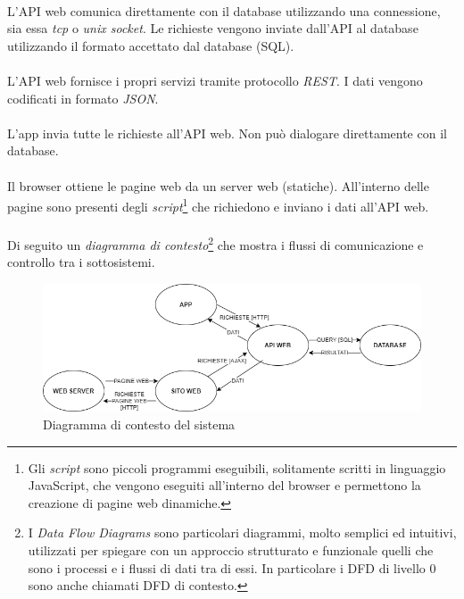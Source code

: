 \documentclass[11pt,a4paper,english]{article}
\begin{document}
\paragraph{} L'API web comunica direttamente con il database utilizzando una connessione, sia essa \emph{tcp} o \emph{unix socket}. Le richieste vengono inviate dall'API al database utilizzando il formato accettato dal database (SQL). 

\paragraph{} L'API web fornisce i propri servizi tramite protocollo \emph{REST}. I dati vengono codificati in formato \emph{JSON}. 

\paragraph{} L'app invia tutte le richieste all'API web. Non può dialogare direttamente con il database.

\paragraph{} Il browser ottiene le pagine web da un server web (statiche). All'interno delle pagine sono presenti degli \emph{script}\footnote{Gli \emph{script} sono piccoli programmi eseguibili, solitamente scritti in linguaggio JavaScript, che vengono eseguiti all'interno del browser e permettono la creazione di pagine web dinamiche.} che richiedono e inviano i dati all'API web. 

\paragraph{} Di seguito un \emph{diagramma di contesto}\footnote{I \emph{Data Flow Diagrams} sono particolari diagrammi, molto semplici ed intuitivi, utilizzati per spiegare con un approccio strutturato e funzionale quelli che sono i processi e i flussi di dati tra di essi. In particolare i DFD di livello 0 sono anche chiamati DFD di contesto.} che mostra i flussi di comunicazione e controllo tra i sottosistemi.

\begin{figure}[H]
    \centering
    \includegraphics[width=1\textwidth]{img/architettura.png}
    \caption{Diagramma di contesto del sistema}
\end{figure}
\end{document}
